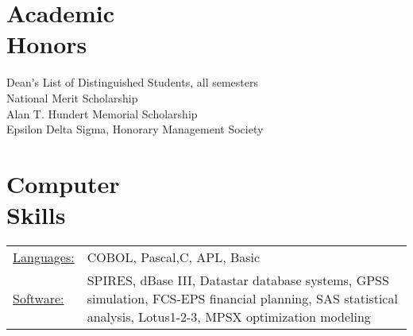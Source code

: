 \documentclass[margin]{res}
\begin{document}
\begin{resume}
\section{Academic \\ Honors} 
Dean's List of Distinguished Students, all semesters \\
National Merit Scholarship \\
Alan T. Hundert Memorial Scholarship \\
 Epsilon Delta Sigma, Honorary Management Society 
 

\section{Computer \\ Skills}
   \begin{tabular}{l p{3in}}
    \underline{Languages:} & COBOL, Pascal,C, APL, Basic \\

     \underline{Software:} &  SPIRES, dBase III, Datastar database 
                        systems, GPSS simulation, FCS-EPS financial 
                        planning, SAS statistical analysis, 
                        Lotus1-2-3, MPSX optimization modeling 
 \end{tabular}

\end{resume} 
\end{document}
